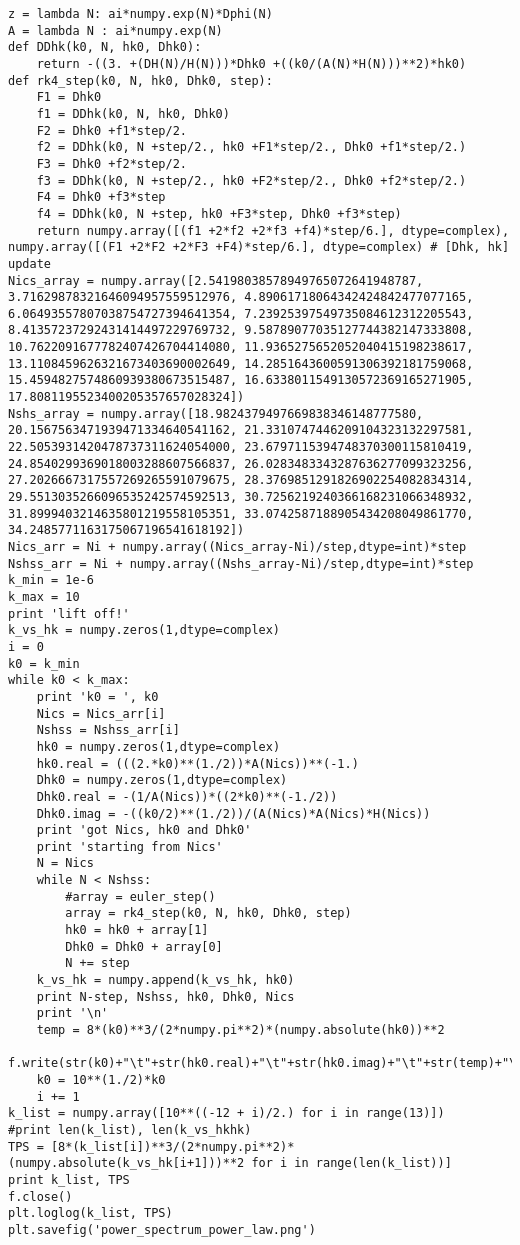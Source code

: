 \documentclass[12pt,a4paper,oneside]{book}
\begin{document}
\begin{appendices}
\begin{verbatim}
z = lambda N: ai*numpy.exp(N)*Dphi(N)
A = lambda N : ai*numpy.exp(N)
def DDhk(k0, N, hk0, Dhk0):
    return -((3. +(DH(N)/H(N)))*Dhk0 +((k0/(A(N)*H(N)))**2)*hk0)
def rk4_step(k0, N, hk0, Dhk0, step):
    F1 = Dhk0
    f1 = DDhk(k0, N, hk0, Dhk0)
    F2 = Dhk0 +f1*step/2.
    f2 = DDhk(k0, N +step/2., hk0 +F1*step/2., Dhk0 +f1*step/2.)
    F3 = Dhk0 +f2*step/2.
    f3 = DDhk(k0, N +step/2., hk0 +F2*step/2., Dhk0 +f2*step/2.)
    F4 = Dhk0 +f3*step
    f4 = DDhk(k0, N +step, hk0 +F3*step, Dhk0 +f3*step)   
    return numpy.array([(f1 +2*f2 +2*f3 +f4)*step/6.], dtype=complex), numpy.array([(F1 +2*F2 +2*F3 +F4)*step/6.], dtype=complex) # [Dhk, hk] update
Nics_array = numpy.array([2.54198038578949765072641948787, 3.71629878321646094957559512976, 4.89061718064342424842477077165, 6.06493557807038754727394641354, 7.23925397549735084612312205543, 8.41357237292431414497229769732, 9.58789077035127744382147333808, 10.7622091677782407426704414080, 11.9365275652052040415198238617, 13.1108459626321673403690002649, 14.2851643600591306392181759068, 15.4594827574860939380673515487, 16.6338011549130572369165271905, 17.8081195523400205357657028324])
Nshs_array = numpy.array([18.9824379497669838346148777580, 20.1567563471939471334640541162, 21.3310747446209104323132297581, 22.5053931420478737311624054000, 23.6797115394748370300115810419, 24.8540299369018003288607566837, 26.0283483343287636277099323256, 27.2026667317557269265591079675, 28.3769851291826902254082834314, 29.5513035266096535242574592513, 30.7256219240366168231066348932, 31.8999403214635801219558105351, 33.0742587188905434208049861770, 34.2485771163175067196541618192])
Nics_arr = Ni + numpy.array((Nics_array-Ni)/step,dtype=int)*step
Nshss_arr = Ni + numpy.array((Nshs_array-Ni)/step,dtype=int)*step
k_min = 1e-6
k_max = 10
print 'lift off!'
k_vs_hk = numpy.zeros(1,dtype=complex)
i = 0
k0 = k_min
while k0 < k_max:
    print 'k0 = ', k0
    Nics = Nics_arr[i]
    Nshss = Nshss_arr[i]
    hk0 = numpy.zeros(1,dtype=complex)
    hk0.real = (((2.*k0)**(1./2))*A(Nics))**(-1.)
    Dhk0 = numpy.zeros(1,dtype=complex)
    Dhk0.real = -(1/A(Nics))*((2*k0)**(-1./2))
    Dhk0.imag = -((k0/2)**(1./2))/(A(Nics)*A(Nics)*H(Nics))
    print 'got Nics, hk0 and Dhk0'
    print 'starting from Nics'
    N = Nics
    while N < Nshss:
        #array = euler_step()
        array = rk4_step(k0, N, hk0, Dhk0, step)
        hk0 = hk0 + array[1]
        Dhk0 = Dhk0 + array[0]
        N += step
    k_vs_hk = numpy.append(k_vs_hk, hk0) 
    print N-step, Nshss, hk0, Dhk0, Nics
    print '\n'
    temp = 8*(k0)**3/(2*numpy.pi**2)*(numpy.absolute(hk0))**2
    f.write(str(k0)+"\t"+str(hk0.real)+"\t"+str(hk0.imag)+"\t"+str(temp)+"\n") 
    k0 = 10**(1./2)*k0
    i += 1
k_list = numpy.array([10**((-12 + i)/2.) for i in range(13)])
#print len(k_list), len(k_vs_hkhk)
TPS = [8*(k_list[i])**3/(2*numpy.pi**2)*(numpy.absolute(k_vs_hk[i+1]))**2 for i in range(len(k_list))]
print k_list, TPS
f.close()
plt.loglog(k_list, TPS)
plt.savefig('power_spectrum_power_law.png')

\end{verbatim}
\end{appendices}
\end{document}
